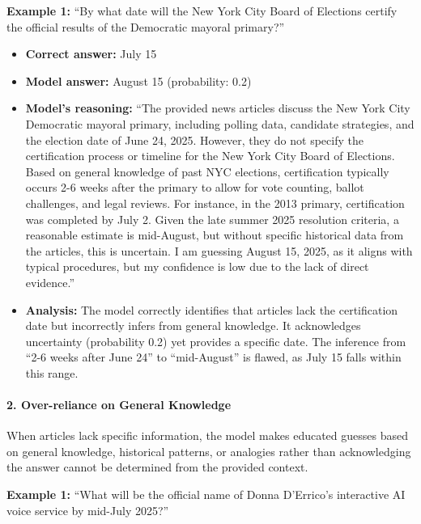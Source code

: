 \documentclass{article} %
\begin{document}
\textbf{Example 1:} ``By what date will the New York City Board of Elections certify the official results of the Democratic mayoral primary?''

\begin{itemize}
\item \textbf{Correct answer:} July 15
\item \textbf{Model answer:} August 15 (probability: 0.2)
\item \textbf{Model's reasoning:} ``The provided news articles discuss the New York City Democratic mayoral primary, including polling data, candidate strategies, and the election date of June 24, 2025. However, they do not specify the certification process or timeline for the New York City Board of Elections. Based on general knowledge of past NYC elections, certification typically occurs 2-6 weeks after the primary to allow for vote counting, ballot challenges, and legal reviews. For instance, in the 2013 primary, certification was completed by July 2. Given the late summer 2025 resolution criteria, a reasonable estimate is mid-August, but without specific historical data from the articles, this is uncertain. I am guessing August 15, 2025, as it aligns with typical procedures, but my confidence is low due to the lack of direct evidence.''
\item \textbf{Analysis:} The model correctly identifies that articles lack the certification date but incorrectly infers from general knowledge. It acknowledges uncertainty (probability 0.2) yet provides a specific date. The inference from ``2-6 weeks after June 24'' to ``mid-August'' is flawed, as July 15 falls within this range.
\end{itemize}

\paragraph{2. Over-reliance on General Knowledge}

When articles lack specific information, the model makes educated guesses based on general knowledge, historical patterns, or analogies rather than acknowledging the answer cannot be determined from the provided context.

\textbf{Example 1:} ``What will be the official name of Donna D'Errico's interactive AI voice service by mid-July 2025?''
\end{document}

